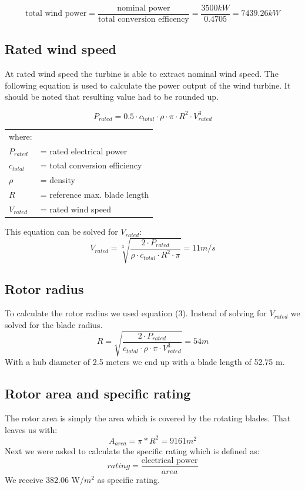 \documentclass[10pt]{article}
\begin{document}
\begin{equation}
\text{total wind power} = \frac{\text{nominal power}}{\text{total conversion efficency}} = \frac{3500 kW}{0.4705} = 7439.26 kW
\end{equation}

\subsection{Rated wind speed}
At rated wind speed the turbine is able to extract nominal wind speed. The following equation is used to calculate the power output of the wind turbine. It should be noted that resulting value had to be rounded up. 

\begin{equation}
P_{rated} = 0.5 \cdot c_{total} \cdot \rho \cdot \pi \cdot R^2 \cdot V_{rated}^3
\end{equation}

\begin{tabular}{l l}
where:&\\
$P_{rated}$ &= rated electrical power\\
$c_{total}$ &= total conversion efficiency\\
$\rho$ &= density\\
$R$ &= reference max. blade length\\
$V_{rated}$& = rated wind speed\\
\end{tabular}

This equation can be solved for $V_{rated}$:
\begin{equation}
V_{rated} = \sqrt[3]{\frac{2 \cdot P_{rated}}{\rho\cdot c_{total}\cdot R^2 \cdot \pi}} = 11 m/s
\end{equation}
\subsection{Rotor radius}
To calculate the rotor radius we used equation (3). Instead of solving for $V_{rated}$ we solved for the blade radius.
\begin{equation}
R = \sqrt{\frac{2 \cdot P_{rated}}{c_{total} \cdot \rho \cdot \pi \cdot V_{rated}^3}} = 54 m
\end{equation}
With a hub diameter of 2.5 meters we end up with a blade length of 52.75 m.
\subsection{Rotor area and specific rating}
The rotor area is simply the area which is covered by the rotating blades. That leaves us with:
\begin{equation}
A_{area} = \pi * R^2 = 9161 m^2
\end{equation}
Next we were asked to calculate the specific rating which is defined as:
\begin{equation}
rating = \frac{\text{electrical power}}{area}
\end{equation}
We receive 382.06 W/$m^2$ as specific rating.
\end{document}
